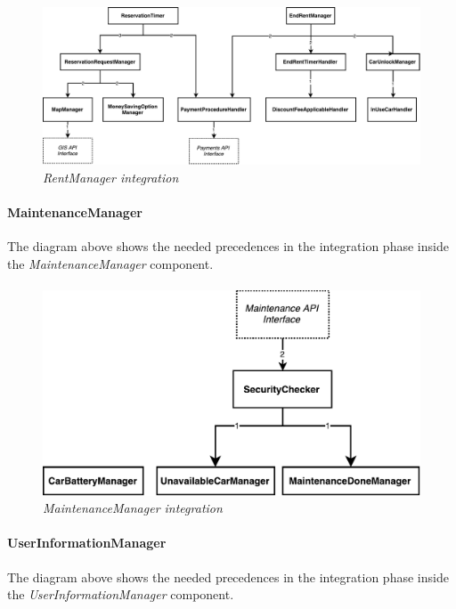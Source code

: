 		\begin{figure}[h]
			\centering
			\includegraphics[width=\linewidth]{img/rentManagerIntegration}
			\caption{
				\label{fig:rentManagerIntegration} 
				\emph{RentManager integration}
			}
		\end{figure}
		
\paragraph{MaintenanceManager} 
The diagram above shows the needed precedences in the integration phase inside the \emph{MaintenanceManager} component.
\paragraph{}

		\begin{figure}[h]
			\centering
			\includegraphics[width=\linewidth]{img/maintenanceIntegration}
			\caption{
				\label{fig:maintenanceIntegration} 
				\emph{MaintenanceManager integration}
			}
		\end{figure}
		
\paragraph{UserInformationManager} 
The diagram above shows the needed precedences in the integration phase inside the \emph{UserInformationManager} component.
